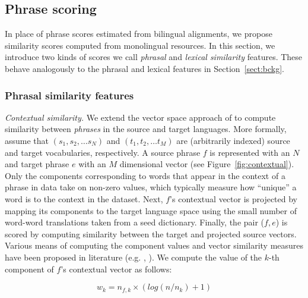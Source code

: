 \documentclass[11pt]{article}
\newcommand{\secref}[1]{Section~\ref{#1}}
\newcommand{\figref}[1]{Figure~\ref{#1}}
\newcommand{\paraheader}[1]{\vskip 0.05in \noindent\emph{#1}}
\begin{document}
\subsection{Phrase scoring} \label{sect:score}

In place of phrase scores estimated from bilingual alignments, we propose similarity scores computed  from monolingual resources.  In this section, we introduce two kinds of scores we call {\em phrasal} and {\em lexical similarity} features.  
These behave analogously to the phrasal and lexical features in \secref{sect:bckg}.

\subsubsection{Phrasal similarity features} \label{sect:phrasalfeats}

\paraheader{Contextual similarity.}  We extend the vector space approach of  to compute similarity between \emph{phrases} in the source and target languages.  More formally, assume that $(s_{1}, s_{2}, \dots s_{N})$ and $(t_{1}, t_{2}, \dots t_{M})$ are (arbitrarily indexed) source and target vocabularies, respectively.  A source phrase $f$ is represented with an $N$ and target phrase $e$ with an $M$ dimensional vector (see \figref{fig:contextual}).  Only the components corresponding to words that appear in the context of a phrase in data take on non-zero values, which typically measure how ``unique'' a word is to the context in the dataset.  Next, $f$'s contextual vector is projected by mapping its components to the target language space using the small number of word-word translations taken from a seed dictionary.
Finally, the pair ($f, e$) is scored by computing similarity between the target  and projected source vectors.  Various means of computing the component values and vector similarity measures have been proposed in literature (e.g. , ).  We compute the value of the $k$-th component of $f$'s contextual vector  as follows: 

\begin{equation*}
w_{k} = n_{f,k} \times (log( {n / n_{k}}) + 1)
\end{equation*}
\end{document}
